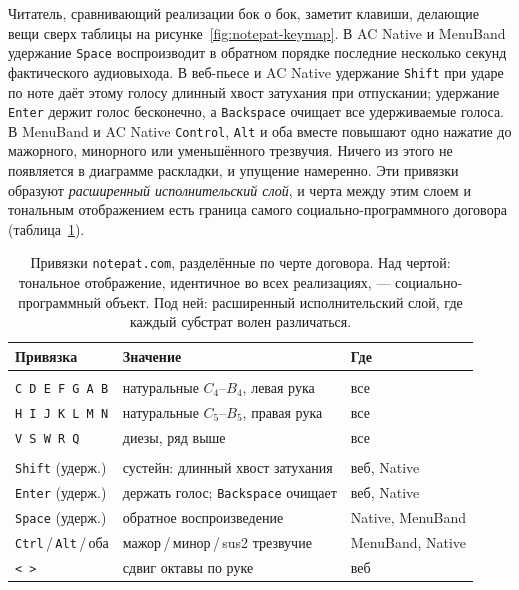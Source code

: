 \documentclass[10pt,letterpaper,twocolumn]{article}
\begin{document}
Читатель, сравнивающий реализации бок о бок, заметит клавиши, делающие вещи сверх таблицы на рисунке~\ref{fig:notepat-keymap}. В AC Native и MenuBand удержание \texttt{Space} воспроизводит в обратном порядке последние несколько секунд фактического аудиовыхода. В веб-пьесе и AC Native удержание \texttt{Shift} при ударе по ноте даёт этому голосу длинный хвост затухания при отпускании; удержание \texttt{Enter} держит голос бесконечно, а \texttt{Backspace} очищает все удерживаемые голоса. В MenuBand и AC Native \texttt{Control}, \texttt{Alt} и оба вместе повышают одно нажатие до мажорного, минорного или уменьшённого трезвучия. Ничего из этого не появляется в диаграмме раскладки, и упущение намеренно. Эти привязки образуют \emph{расширенный исполнительский слой}, и черта между этим слоем и тональным отображением есть граница самого социально-программного договора (таблица~\ref{tab:contract-line}).

\begin{table}[t]
\footnotesize
\setlength{\tabcolsep}{3pt}
\renewcommand{\arraystretch}{1.05}
\centering
\caption{Привязки \texttt{notepat.com}, разделённые по черте договора. Над чертой: тональное отображение, идентичное во всех реализациях, --- социально-программный объект. Под ней: расширенный исполнительский слой, где каждый субстрат волен различаться.}
\label{tab:contract-line}
\begin{tabularx}{\columnwidth}{@{}>{\RaggedRight}p{}>{\RaggedRight}X>{\RaggedRight\arraybackslash}p{}@{}}
\toprule
\textbf{Привязка} & \textbf{Значение} & \textbf{Где} \\
\midrule
\multicolumn{3}{@{}l}{\emph{Тональный договор}} \\[0.1em]
\texttt{C D E F G A B} & натуральные $C_4$--$B_4$, левая рука & все \\
\texttt{H I J K L M N} & натуральные $C_5$--$B_5$, правая рука & все \\
\texttt{V S W R Q} & диезы, ряд выше & все \\
\midrule
\multicolumn{3}{@{}l}{\emph{Расширенный исполнительский слой}} \\[0.1em]
\texttt{Shift} (удерж.) & сустейн: длинный хвост затухания & веб, Native \\
\texttt{Enter} (удерж.) & держать голос; \texttt{Backspace} очищает & веб, Native \\
\texttt{Space} (удерж.) & обратное воспроизведение & Native, MenuBand \\
\texttt{Ctrl}\,/\,\texttt{Alt}\,/\,оба & мажор\,/\,минор\,/\,sus2 трезвучие & MenuBand, Native \\
\texttt{<}~\texttt{>} & сдвиг октавы по руке & веб \\
\bottomrule
\end{tabularx}
\end{table}
\end{document}
